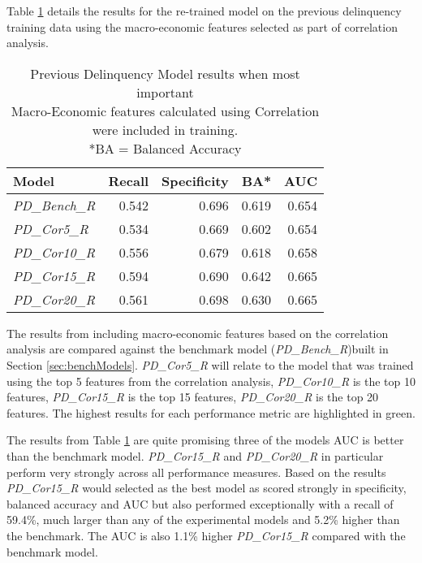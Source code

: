 Table \ref{table:PDCorrModelResults} details the results for the
re-trained model on the previous delinquency training data using the macro-economic features selected as part of correlation analysis.

\begin{table}[H]
\centering
\small
		\begin{tabular}{l r r r r}
			\hline
			\textbf{Model} & \textbf{Recall} & \textbf{Specificity} & \textbf{BA*} & \textbf{AUC}  \\ \hline
			\textit{PD\_Bench\_R} & 0.542 & 0.696 & 0.619 & 0.654 \\ \hline
			\textit{PD\_Cor5\_R}  & 0.534 & 0.669 & 0.602 & 0.654   \\ 
			\textit{PD\_Cor10\_R} & 0.556 & 0.679 & 0.618 & 0.658  \\ 
			\textit{PD\_Cor15\_R} & \cellcolor{green!25}0.594 & 0.690 & \cellcolor{green!25}0.642 & 0.665  \\
			\textit{PD\_Cor20\_R} & 0.561 & \cellcolor{green!25}0.698 & 0.630 & \cellcolor{green!25}0.665  \\\hline
		\end{tabular}
	\caption{Previous Delinquency Model results when most important \\Macro-Economic features calculated using Correlation were included in training.\\
		*BA = Balanced Accuracy}
	\label{table:PDCorrModelResults}
\end{table}

The results from including macro-economic features based on the correlation analysis are compared against the benchmark model (\textit{PD\_Bench\_R})built in Section \ref{sec:benchModels}. \textit{PD\_Cor5\_R} will relate to the model that was trained using the top 5 features from the correlation analysis, \textit{PD\_Cor10\_R} is the top 10 features, \textit{PD\_Cor15\_R} is the top 15 features, \textit{PD\_Cor20\_R} is the top 20 features. The highest results for each performance metric are highlighted in green.

The results from Table \ref{table:PDCorrModelResults} are quite promising three of the models AUC is better than the benchmark model. \textit{PD\_Cor15\_R} and \textit{PD\_Cor20\_R} in particular perform very strongly across all performance measures. Based on the results \textit{PD\_Cor15\_R} would selected as the best model as scored strongly in specificity, balanced accuracy and AUC but also performed exceptionally with a recall of 59.4\%, much larger than any of the experimental models and 5.2\% higher than the benchmark. The AUC is also 1.1\% higher \textit{PD\_Cor15\_R} compared with the benchmark model.


